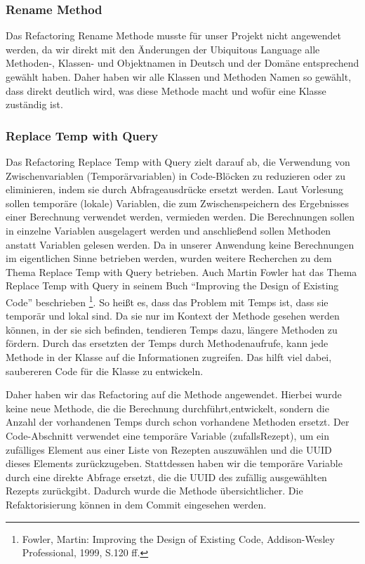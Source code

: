 \subsubsection{Rename Method}
Das Refactoring Rename Methode musste für unser Projekt nicht angewendet werden, da wir direkt mit den Änderungen der Ubiquitous Language alle Methoden-, Klassen- und Objektnamen in Deutsch und der Domäne entsprechend gewählt haben. Daher haben wir alle Klassen und Methoden Namen so gewählt, dass direkt deutlich wird, was diese Methode macht und wofür eine Klasse zuständig ist.

\subsubsection{Replace Temp with Query}
Das Refactoring Replace Temp with Query zielt darauf ab, die Verwendung von Zwischenvariablen (Temporärvariablen) in Code-Blöcken zu reduzieren oder zu eliminieren, indem sie durch Abfrageausdrücke ersetzt werden. 
Laut Vorlesung sollen temporäre (lokale) Variablen, die zum Zwischenspeichern des Ergebnisses einer Berechnung verwendet werden, vermieden werden. Die Berechnungen sollen in einzelne Variablen ausgelagert werden und anschließend sollen Methoden anstatt Variablen gelesen werden. 
Da in unserer Anwendung keine Berechnungen im eigentlichen Sinne betrieben werden, wurden weitere Recherchen zu dem Thema Replace Temp with Query betrieben. Auch Martin Fowler hat das Thema Replace Temp with Query in seinem Buch \enquote{Improving the Design of Existing Code} beschrieben \footnote[1]{Fowler, Martin: Improving the Design of Existing Code, Addison-Wesley Professional, 1999, S.120 ff.}. So heißt es, dass das Problem mit Temps ist, dass sie temporär und lokal sind. Da sie nur im Kontext der Methode gesehen werden können, in der sie sich befinden, tendieren Temps dazu, längere Methoden zu fördern. Durch das ersetzten der Temps durch Methodenaufrufe, kann jede Methode in der Klasse auf die Informationen zugreifen. Das hilft viel dabei, saubereren Code für die Klasse zu entwickeln.

Daher haben wir das Refactoring auf die Methode  angewendet. Hierbei wurde keine neue Methode, die die Berechnung durchführt,entwickelt, sondern die Anzahl der vorhandenen Temps durch schon vorhandene Methoden ersetzt. Der Code-Abschnitt verwendet eine temporäre Variable (zufallsRezept), um ein zufälliges Element aus einer Liste von Rezepten auszuwählen und die UUID dieses Elements zurückzugeben. Stattdessen haben wir die temporäre Variable durch eine direkte Abfrage ersetzt, die die UUID des zufällig ausgewählten Rezepts zurückgibt. Dadurch wurde die Methode übersichtlicher. Die Refaktorisierung können in dem Commit \href{https://github.com/MichaelaHaag/RezeptApp/commit/4e0bedc859ba644d448fe4c89a3a6e1320519593}{} eingesehen werden. 

